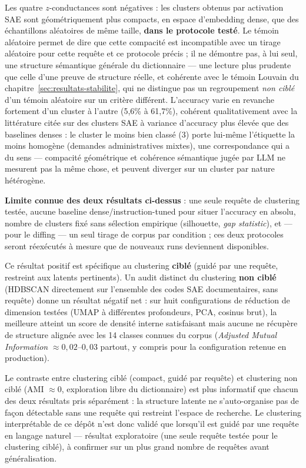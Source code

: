 \documentclass[11pt]{article}
\begin{document}
Les quatre $z$-conductances sont négatives : les clusters obtenus par
activation SAE sont géométriquement plus compacts, en espace d'embedding
dense, que des échantillons aléatoires de même taille, \textbf{dans le
protocole testé}. Le témoin aléatoire permet de dire que cette compacité est
incompatible avec un tirage aléatoire pour cette requête et ce protocole
précis ; il ne démontre pas, à lui seul, une structure sémantique générale du
dictionnaire --- une lecture plus prudente que celle d'une \og{}preuve de
structure réelle\fg{}, et cohérente avec le témoin Louvain du
chapitre~\ref{sec:resultats-stabilite}, qui ne distingue pas un regroupement
\emph{non ciblé} d'un témoin aléatoire sur un critère différent. L'accuracy
varie en revanche fortement d'un cluster à l'autre (5,6\% à 61,7\%), cohérent
qualitativement avec la littérature citée sur des clusters SAE à variance
d'accuracy plus élevée que des baselines denses : le cluster le moins bien
classé (3) porte lui-même l'étiquette la moins homogène (\og{}demandes
administratives mixtes\fg{}), une correspondance qui a du sens --- compacité
géométrique et cohérence sémantique jugée par LLM ne mesurent pas la même
chose, et peuvent diverger sur un cluster par nature hétérogène.

\textbf{Limite connue des deux résultats ci-dessus} : une seule requête de
clustering testée, aucune baseline dense/instruction-tuned pour situer
l'accuracy en absolu, nombre de clusters fixé sans sélection empirique
(silhouette, \emph{gap statistic}), et --- pour le diffing --- un seul
tirage de corpus par condition ; ces deux protocoles seront réexécutés à
mesure que de nouveaux runs deviennent disponibles.

Ce résultat positif est spécifique au clustering \textbf{ciblé} (guidé par
une requête, restreint aux latents pertinents). Un audit distinct du
clustering \textbf{non ciblé} (HDBSCAN directement sur l'ensemble des codes
SAE documentaires, sans requête) donne un résultat négatif net : sur huit
configurations de réduction de dimension testées (UMAP à différentes
profondeurs, PCA, cosinus brut), la meilleure atteint un score de densité
interne satisfaisant mais aucune ne récupère de structure alignée avec les
14 classes connues du corpus (\emph{Adjusted Mutual Information}
$\approx 0,02$--$0,03$ partout, y compris pour la configuration retenue en
production).

\begin{diagnosticbox}
Le contraste entre clustering ciblé (compact, guidé par requête) et
clustering non ciblé (AMI $\approx 0$, exploration libre du dictionnaire) est
plus informatif que chacun des deux résultats pris séparément : la structure
latente ne s'auto-organise pas de façon détectable sans une requête qui
restreint l'espace de recherche. Le clustering interprétable de ce dépôt
n'est donc validé que lorsqu'il est guidé par une requête en langage
naturel --- résultat exploratoire (une seule requête testée pour le
clustering ciblé), à confirmer sur un plus grand nombre de requêtes avant
généralisation.
\end{diagnosticbox}
\end{document}
